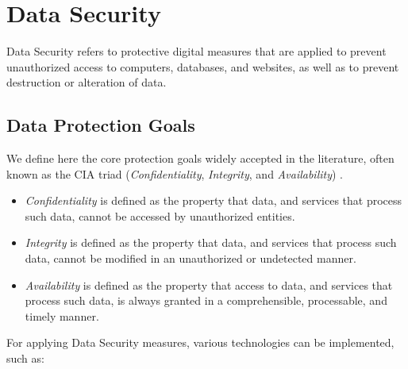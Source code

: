 
\section{Data Security} 
\label{sec:DataSecurity}


Data Security refers to protective digital measures that are applied to prevent unauthorized access to computers, databases, and websites, as well as to prevent destruction or alteration of data.


\subsection{Data Protection Goals}
\label{ssec:DataProtectionGoals}


We define here the core protection goals widely accepted in the literature, often known as the CIA triad (\textit{Confidentiality}, \textit{Integrity}, and \textit{Availability}) \cite{Hansen2015}.

\begin{itemize}
    \setlength\itemsep{1em}

    \item \textit{Confidentiality} is defined as the property that data, and services that process such data, cannot be accessed by unauthorized entities.

    \item \textit{Integrity} is defined as the property that data, and services that process such data, cannot be modified in an unauthorized or undetected manner.

    \item \textit{Availability} is defined as the property that access to data, and services that process such data, is always granted in a comprehensible, processable, and timely manner.

\end{itemize}


For applying Data Security measures, various technologies can be implemented, such as:

